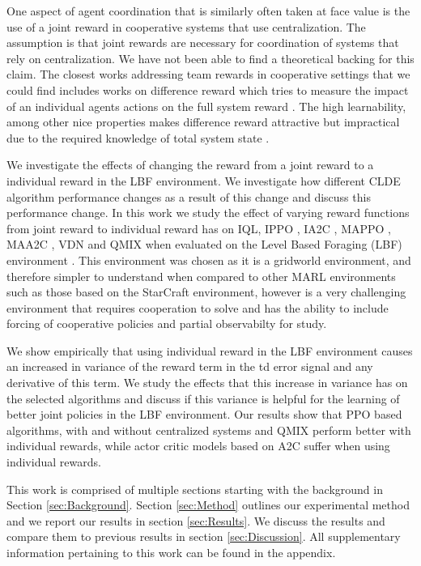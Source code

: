 \documentclass[systems,article,submit,pdftex,moreauthors]{Definitions/mdpi}
\begin{document}
One aspect of agent coordination that is similarly often taken at face value is the use of a joint reward in cooperative systems that use centralization. The assumption is that joint rewards are necessary for coordination of systems that rely on centralization. We have not been able to find a theoretical backing for this claim. The closest works addressing team rewards in cooperative settings that we could find includes works on difference reward which tries to measure the impact of an individual agents actions on the full system reward \cite{tumerdifferencerewards}. The high learnability, among other nice properties makes difference reward attractive but impractical due to the required knowledge of total system state \cite{colby2016local, agogino2008analyzing, proper2012modeling}.

We investigate the effects of changing the reward from a joint reward to a individual reward in the LBF environment. We investigate how different CLDE algorithm performance changes as a result of this change and discuss this performance change.  
In this work we study the effect of varying reward functions from joint reward to individual reward has on IQL\cite{mnih2015dqn}, IPPO \cite{DBLP:ppo}, IA2C \cite{DBLP:A3C}, MAPPO \cite{DBLP:MAPPO}, MAA2C \cite{DBLP:Benchmarking, DBLP:A3C}, VDN \cite{sunehag2017vdn} and QMIX\cite{DBLP:Qmix} when evaluated on the Level Based Foraging (LBF) environment\cite{LBF} . This environment was chosen as it is a gridworld environment, and therefore simpler to understand when compared to other MARL environments such as those based on the StarCraft environment, however is a very challenging environment that requires cooperation to solve and has the ability to include forcing of cooperative policies and partial observabilty for study. 

We show empirically that using individual reward in the LBF environment causes an increased in variance of the reward term in the td error signal and any derivative of this term. We study the effects that this increase in variance has on the selected algorithms and discuss if this variance is helpful for the learning of better joint policies in the LBF environment. Our results show that PPO based algorithms, with and without centralized systems and QMIX perform better with individual rewards, while actor critic models based on A2C suffer when using individual rewards.      

This work is comprised of multiple sections starting with the background in Section \ref{sec:Background}.  
Section \ref{sec:Method} outlines our experimental method and we report our results in section \ref{sec:Results}. We discuss the results and compare them to previous results in section \ref{sec:Discussion}. All supplementary information pertaining to this work can be found in the appendix. 
\end{document}
